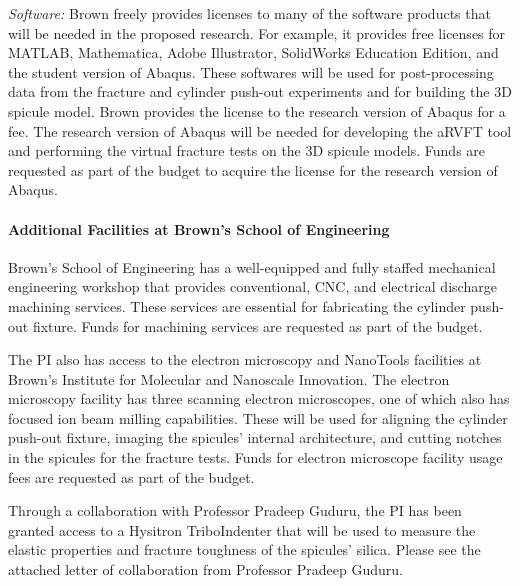 \documentclass[10pt,letterpaper]{article}
\begin{document}
\textit{Software: }
Brown freely provides licenses to many of the software products that will be needed in the proposed research.
%
For example, it provides free licenses for  MATLAB, Mathematica, Adobe Illustrator, SolidWorks Education Edition, and the student version of Abaqus. These softwares will be used for post-processing data from the fracture and cylinder push-out experiments and for building the 3D spicule model.
%
Brown provides the license to the research version of Abaqus for a fee. The research version of Abaqus will be needed for developing the aRVFT tool and performing the virtual fracture tests on the 3D spicule models. Funds are requested as part of the budget to acquire the license for the research version of Abaqus.

\paragraph{Additional Facilities at Brown's School of Engineering}
Brown's School of Engineering has a well-equipped and fully staffed mechanical engineering workshop that provides conventional, CNC, and electrical discharge machining services. These services are essential for fabricating the cylinder push-out fixture. Funds for machining services are requested as part of the budget.

The PI also has access to the electron microscopy and NanoTools facilities at Brown's Institute for Molecular and Nanoscale Innovation. The electron microscopy facility has three scanning electron microscopes, one of which also has focused ion beam milling capabilities. These will be used for aligning the cylinder push-out fixture, imaging the spicules' internal architecture, and cutting notches in the spicules for the fracture tests. Funds for electron microscope facility usage fees are requested as part of the budget.

Through a collaboration with Professor Pradeep Guduru, the PI has been granted access to a Hysitron TriboIndenter that will be used to measure the elastic properties and fracture toughness of the spicules' silica. Please see the attached letter of collaboration from Professor Pradeep Guduru.
\end{document}
